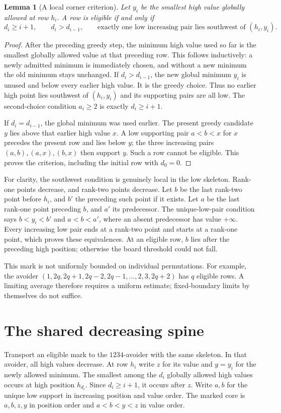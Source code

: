 \documentclass[11pt,letterpaper]{article}
\newtheorem{lemma}[theorem]{Lemma}
\theoremstyle{remark}\newtheorem{remark}[theorem]{Remark}
\numberwithin{equation}{section}
\begin{document}
\begin{lemma}[A local corner criterion]\label{upo:1243:lem:corner}
Let $y_i$ be the smallest high value globally allowed at row $h_i$.
A row is eligible if and only if
\begin{equation}\label{upo:1243:eq:corner}
 d_i\ge i+1,\qquad d_i>d_{i-1},\qquad
 \text{exactly one low increasing pair lies southwest of }(h_i,y_i).
\end{equation}
\end{lemma}
\begin{proof}
After the preceding greedy step, the minimum high value used so far is
the smallest globally allowed value at that preceding row. This follows
inductively: a newly admitted minimum is immediately chosen, and without
a new minimum the old minimum stays unchanged. If $d_i>d_{i-1}$, the new
global minimum $y_i$ is unused and below every earlier high value. It is
the greedy choice. Thus no earlier high point lies southwest of
$(h_i,y_i)$ and its supporting pairs are all low. The second-choice
condition $a_i\ge2$ is exactly $d_i\ge i+1$.

If $d_i=d_{i-1}$, the global minimum was used earlier. The present greedy
candidate $y$ lies above that earlier high value $x$. A low supporting
pair $a<b<x$ for $x$ precedes the present row and lies below $y$; the
three increasing pairs $(a,b),(a,x),(b,x)$ then support $y$. Such a row
cannot be eligible. This proves the criterion, including the initial row
with $d_0=0$.
\end{proof}

For clarity, the southwest condition is genuinely local in the low
skeleton. Rank-one points decrease, and rank-two points decrease. Let
$b$ be the last rank-two point before $h_i$, and $b'$ the preceding such
point if it exists. Let $a$ be the last rank-one point preceding $b$, and
$a'$ its predecessor. The unique-low-pair condition says
$b<y_i<b'$ and $a<b<a'$, where an absent predecessor has value $+\infty$.
Every increasing low pair ends at a rank-two point and starts at a
rank-one point, which proves these equivalences. At an eligible row,
$b$ lies after the preceding high position; otherwise the board threshold
could not fall.

This mark is not uniformly bounded on individual permutations. For
example, the avoider
$(1,2q,2q+1,2q-2,2q-1,\ldots,2,3,2q+2)$ has $q$ eligible rows.
A limiting average therefore requires a uniform estimate; fixed-boundary
limits by themselves do not suffice.

\section{The shared decreasing spine}\label{upo:1243:sec:spine}
Transport an eligible mark to the $1234$-avoider with the same skeleton.
In that avoider, all high values decrease. At row $h_i$ write $z$ for its
value and $y=y_i$ for the newly allowed minimum. The smallest among the
$d_i$ globally allowed high values occurs at high position $h_{d_i}$.
Since $d_i\ge i+1$, it occurs after $z$. Write $a,b$ for the unique low
support in increasing position and value order. The marked core is
$a,b,z,y$ in position order and $a<b<y<z$ in value order.
\end{document}
